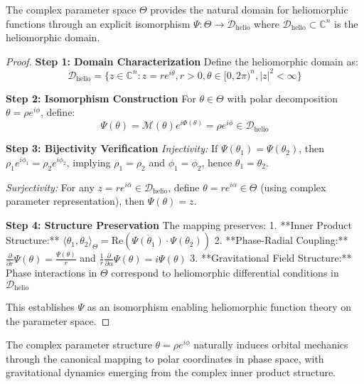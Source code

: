 \begin{theorem}
\label{thm:heliomorphic_connection}
The complex parameter space $\Theta$ provides the natural domain for heliomorphic functions through an explicit isomorphism $\Psi: \Theta \rightarrow \mathcal{D}_{\text{helio}}$ where $\mathcal{D}_{\text{helio}} \subset \mathbb{C}^n$ is the heliomorphic domain.
\end{theorem}

\begin{proof}
\textbf{Step 1: Domain Characterization}
Define the heliomorphic domain as:
$$\mathcal{D}_{\text{helio}} = \{z \in \mathbb{C}^n : z = re^{i\theta}, r > 0, \theta \in [0,2\pi)^n, |z|^2 < \infty\}$$

\textbf{Step 2: Isomorphism Construction}
For $\theta \in \Theta$ with polar decomposition $\theta = \rho e^{i\phi}$, define:
$$\Psi(\theta) = \mathcal{M}(\theta)e^{i\Phi(\theta)} = \rho e^{i\phi} \in \mathcal{D}_{\text{helio}}$$

\textbf{Step 3: Bijectivity Verification}
\textit{Injectivity:} If $\Psi(\theta_1) = \Psi(\theta_2)$, then $\rho_1 e^{i\phi_1} = \rho_2 e^{i\phi_2}$, implying $\rho_1 = \rho_2$ and $\phi_1 = \phi_2$, hence $\theta_1 = \theta_2$.

\textit{Surjectivity:} For any $z = re^{i\alpha} \in \mathcal{D}_{\text{helio}}$, define $\theta = re^{i\alpha} \in \Theta$ (using complex parameter representation), then $\Psi(\theta) = z$.

\textbf{Step 4: Structure Preservation}
The mapping preserves:
1. **Inner Product Structure:** $\langle \theta_1, \theta_2 \rangle_\Theta = \text{Re}(\overline{\Psi(\theta_1)} \cdot \Psi(\theta_2))$
2. **Phase-Radial Coupling:** $\frac{\partial}{\partial r}\Psi(\theta) = \frac{\Psi(\theta)}{r}$ and $\frac{1}{r}\frac{\partial}{\partial \alpha}\Psi(\theta) = i\Psi(\theta)$
3. **Gravitational Field Structure:** Phase interactions in $\Theta$ correspond to heliomorphic differential conditions in $\mathcal{D}_{\text{helio}}$

This establishes $\Psi$ as an isomorphism enabling heliomorphic function theory on the parameter space.
\end{proof}

\begin{theorem}
\label{thm:orbital_mechanics_connection}
The complex parameter structure $\theta = \rho e^{i\phi}$ naturally induces orbital mechanics through the canonical mapping to polar coordinates in phase space, with gravitational dynamics emerging from the complex inner product structure.
\end{theorem}

